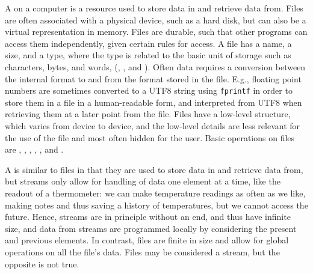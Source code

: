 \documentclass[fsharpNotes.tex]{subfiles}
\begin{document}
A  on a computer is a resource used to store data in and retrieve data from. Files are often associated with a physical device, such as a hard disk, but can also be a virtual representation in memory. Files are durable, such that other programs can access them independently, given certain rules for access. A file has a name, a size, and a type, where the type is related to the basic unit of storage such as characters, bytes, and words, (, , and ). Often data requires a conversion between the internal format to and from the format stored in the file. E.g., floating point numbers are sometimes converted to a UTF8 string using \lstinline!fprintf! in order to store them in a file in a human-readable form, and interpreted from UTF8 when retrieving them at a later point from the file. Files have a low-level structure, which varies from device to device, and the low-level details are less relevant for the use of the file and most often hidden for the user. Basic operations on files are , , , , , and .

A  is similar to files in that they are used to store data in and retrieve data from, but streams only allow for handling of data one element at a time, like the readout of a thermometer: we can make temperature readings as often as we like, making notes and thus saving a history of temperatures, but we cannot access the future. Hence, streams are in principle without an end, and thus have infinite size, and data from streams are programmed locally by considering the present and previous elements. In contrast, files are finite in size and allow for global operations on all the file's data. Files may be considered a stream, but the opposite is not true.

\end{document}
